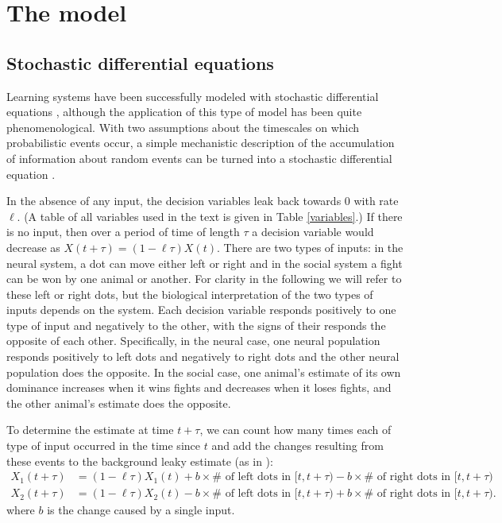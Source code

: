 \documentclass{article}
\begin{document}
\section{The model \label{derivation}}
\subsection{Stochastic differential equations }
Learning systems have been successfully modeled with stochastic differential equations \citep{Eckhoff:2008uq, Brown:2005fk,Feng:2009kl,Bogacz:2006uq}, although the application of this type of model has been quite phenomenological.  With two assumptions about the timescales on which probabilistic events occur, a simple mechanistic description of the accumulation of information about random events can be turned into a stochastic differential equation \cite{Gillespie:2000fk}.  


In the absence of any input, the decision variables leak back towards $0$ with rate $\ell$.  (A table of all variables used in the text is given in Table \ref{variables}.)  If there is no input, then over a period of time of length $\tau$ a decision variable would decrease as $X(t+\tau)=(1-\ell\tau)X(t)$.  There are two types of inputs: in the neural system, a dot can move either left or right and in the social system a fight can be won by one animal or another.  For clarity in the following we will refer to these left or right dots, but the biological interpretation of the two types of inputs depends on the system.  Each decision variable responds positively to one type of input and negatively to the other, with the signs of their responds the opposite of each other.  Specifically, in the neural case, one neural population responds positively to left dots and negatively to right dots and the other neural population does the opposite.  In the social case, one animal's estimate of its own dominance increases when it wins fights and decreases when it loses fights, and the other animal's estimate does the opposite.  

To determine the estimate at time $t+\tau$, we can count how many times each of type of input occurred in the time since $t$ and add the changes resulting from these events to the background leaky estimate (as in \cite{Gillespie:2000fk}):
\begin{align*}
X_1(t+\tau)&=(1-\ell\tau)X_1(t)+b\times\# \text{ of left dots in }[t,t+\tau)-b\times\# \text{ of right dots in }[t,t+\tau)
\\ X_2(t+\tau)&=(1-\ell\tau)X_2(t)-b\times\# \text{ of left dots in }[t,t+\tau)+b\times\# \text{ of right dots in }[t,t+\tau). 
\end{align*}
where $b$ is the change caused by a single input.
\end{document}
